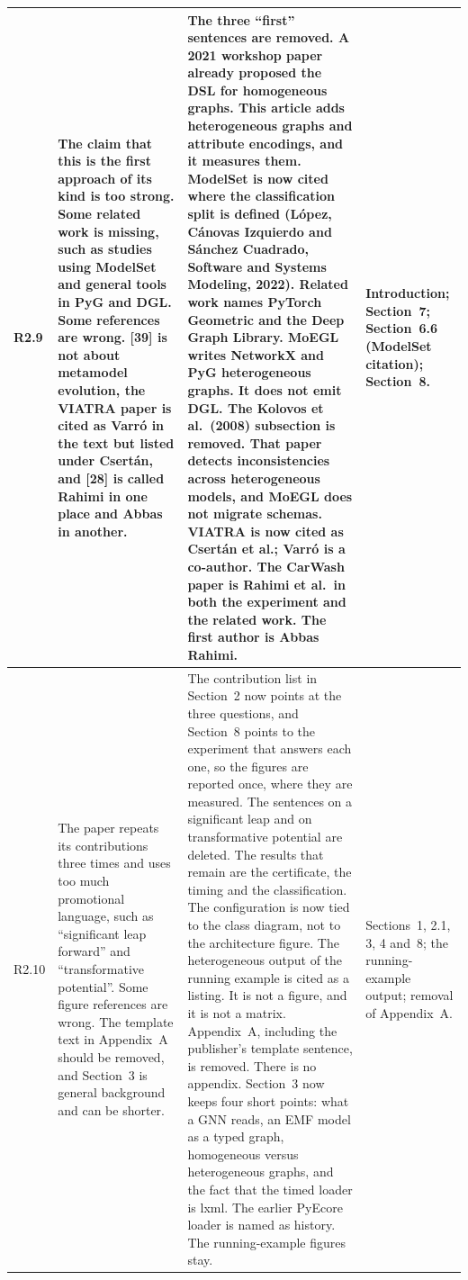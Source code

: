 \documentclass[11pt,a4paper]{article}
\begin{document}
\begin{longtable}{@{}P{1.0cm}P{4.3cm}P{5.9cm}P{3.9cm}@{}}
R2.9 &
The claim that this is the first approach of its kind is too strong. Some related work is missing, such as studies using ModelSet and general tools in PyG and DGL. Some references are wrong. [39] is not about metamodel evolution, the VIATRA paper is cited as Varr\'o in the text but listed under Csert\'an, and [28] is called Rahimi in one place and Abbas in another. &
The three ``first'' sentences are removed. A 2021 workshop paper already proposed the DSL for homogeneous graphs. This article adds heterogeneous graphs and attribute encodings, and it measures them.
ModelSet is now cited where the classification split is defined (L\'opez, C\'anovas Izquierdo and S\'anchez Cuadrado, Software and Systems Modeling, 2022). Related work names PyTorch Geometric and the Deep Graph Library. MoEGL writes NetworkX and PyG heterogeneous graphs. It does not emit DGL.
The Kolovos et al.\ (2008) subsection is removed. That paper detects inconsistencies across heterogeneous models, and MoEGL does not migrate schemas. VIATRA is now cited as Csert\'an et al.; Varr\'o is a co-author. The CarWash paper is Rahimi et al.\ in both the experiment and the related work. The first author is Abbas Rahimi. &
Introduction; Section~7; Section~6.6 (ModelSet citation); Section~8. \\
\midrule

R2.10 &
The paper repeats its contributions three times and uses too much promotional language, such as ``significant leap forward'' and ``transformative potential''. Some figure references are wrong. The template text in Appendix~A should be removed, and Section~3 is general background and can be shorter. &
The contribution list in Section~2 now points at the three questions, and Section~8 points to the experiment that answers each one, so the figures are reported once, where they are measured. The sentences on a significant leap and on transformative potential are deleted. The results that remain are the certificate, the timing and the classification.
The configuration is now tied to the class diagram, not to the architecture figure. The heterogeneous output of the running example is cited as a listing. It is not a figure, and it is not a matrix. Appendix~A, including the publisher's template sentence, is removed. There is no appendix.
Section~3 now keeps four short points: what a GNN reads, an EMF model as a typed graph, homogeneous versus heterogeneous graphs, and the fact that the timed loader is lxml. The earlier PyEcore loader is named as history. The running-example figures stay. &
Sections~1, 2.1, 3, 4 and~8; the running-example output; removal of Appendix~A. \\

\end{longtable}
\end{document}
